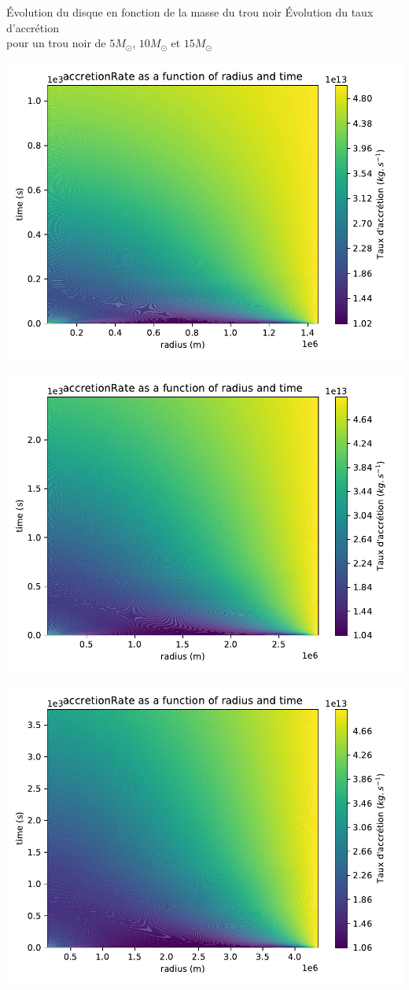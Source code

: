 \documentclass{beamer}
\begin{document}
\begin{frame}{Évolution du disque en fonction de la masse du trou noir}
	\centering
	Évolution du taux d'accrétion \\pour un trou noir de $5 M_{\odot}$, $10 M_{\odot}$ et $15 M_{\odot}$
   \begin{minipage}[c]{.49\linewidth}
      \includegraphics[width = 0.85\linewidth]{accretionRate5M}
   \end{minipage} \hfill
   \begin{minipage}[c]{.49\linewidth}
      \includegraphics[width = 0.85\linewidth]{accretionRate10M}
   \end{minipage}
   \includegraphics[width = 0.44\linewidth]{accretionRate15M}
\end{frame}
\end{document}
